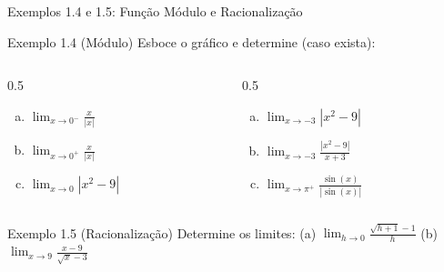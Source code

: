 \documentclass[10pt,aspectratio=169]{beamer}
\begin{document}
\begin{frame}{Exemplos 1.4 e 1.5: Função Módulo e Racionalização}
    \transfade
    \begin{exampleblock}{Exemplo 1.4 (Módulo)}
        Esboce o gráfico e determine (caso exista):
        \begin{columns}[t]
            \begin{column}{0.5\textwidth}
                \begin{enumerate}[(a)]
                    \item $\lim_{x \to 0^-} \frac{x}{|x|}$
                    \item $\lim_{x \to 0^+} \frac{x}{|x|}$
                    \item $\lim_{x \to 0} |x^2-9|$
                \end{enumerate}
            \end{column}
            \begin{column}{0.5\textwidth}
                \begin{enumerate}[(d)]
                    \item $\lim_{x \to -3} |x^2-9|$
                    \item $\lim_{x \to -3} \frac{|x^2-9|}{x+3}$
                    \item $\lim_{x \to \pi^+} \frac{\sin(x)}{|\sin(x)|}$
                \end{enumerate}
            \end{column}
        \end{columns}
    \end{exampleblock}

    \vspace{0.2cm}\pause
    \begin{exampleblock}{Exemplo 1.5 (Racionalização)}
        Determine os limites:
        \quad (a) $\lim_{h \to 0} \frac{\sqrt{h+1}-1}{h}$ \qquad (b) $\lim_{x \to 9} \frac{x-9}{\sqrt{x}-3}$
    \end{exampleblock}
\end{frame}
\end{document}
